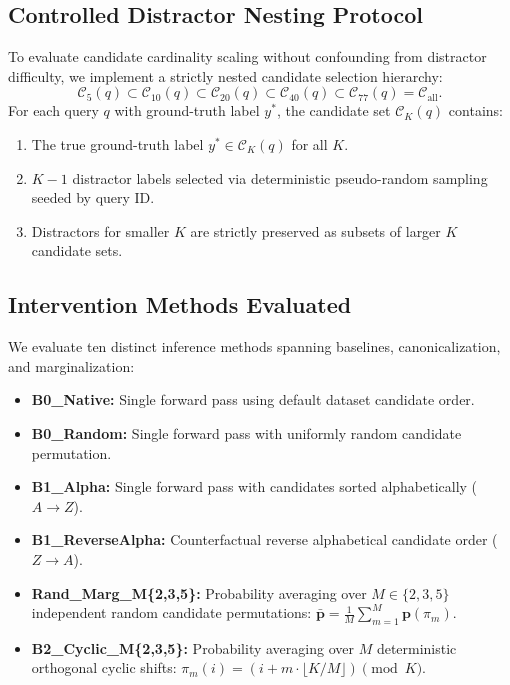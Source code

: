 \documentclass[10pt]{article}
\begin{document}
\subsection{Controlled Distractor Nesting Protocol}
To evaluate candidate cardinality scaling without confounding from distractor difficulty, we implement a strictly nested candidate selection hierarchy:
\begin{equation}
\mathcal{C}_5(q) \subset \mathcal{C}_{10}(q) \subset \mathcal{C}_{20}(q) \subset \mathcal{C}_{40}(q) \subset \mathcal{C}_{77}(q) = \mathcal{C}_{\text{all}}.
\end{equation}
For each query $q$ with ground-truth label $y^*$, the candidate set $\mathcal{C}_K(q)$ contains:
\begin{enumerate}
    \item The true ground-truth label $y^* \in \mathcal{C}_K(q)$ for all $K$.
    \item $K-1$ distractor labels selected via deterministic pseudo-random sampling seeded by query ID.
    \item Distractors for smaller $K$ are strictly preserved as subsets of larger $K$ candidate sets.
\end{enumerate}

\subsection{Intervention Methods Evaluated}
We evaluate ten distinct inference methods spanning baselines, canonicalization, and marginalization:
\begin{itemize}
    \item \textbf{B0\_Native:} Single forward pass using default dataset candidate order.
    \item \textbf{B0\_Random:} Single forward pass with uniformly random candidate permutation.
    \item \textbf{B1\_Alpha:} Single forward pass with candidates sorted alphabetically ($A \to Z$).
    \item \textbf{B1\_ReverseAlpha:} Counterfactual reverse alphabetical candidate order ($Z \to A$).
    \item \textbf{Rand\_Marg\_M\{2,3,5\}:} Probability averaging over $M \in \{2, 3, 5\}$ independent random candidate permutations: $\bar{\mathbf{p}} = \frac{1}{M}\sum_{m=1}^M \mathbf{p}(\pi_m)$.
    \item \textbf{B2\_Cyclic\_M\{2,3,5\}:} Probability averaging over $M$ deterministic orthogonal cyclic shifts: $\pi_m(i) = (i + m \cdot \lfloor K/M \rfloor) \pmod K$.
\end{itemize}
\end{document}
